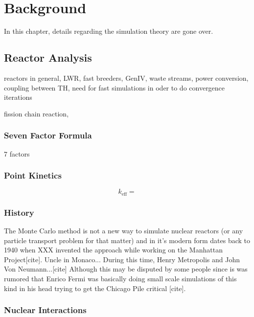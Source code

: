 \chapter{Background}

In this chapter, details regarding the simulation theory are gone over.  

\section{Reactor Analysis}

reactors in general, LWR, fast breeders, GenIV, waste streams, power conversion, coupling between TH, need for fast simulations in oder to do convergence iterations

fission chain reaction, 

\subsection{Seven Factor Formula}
 7 factors

\subsection{Point Kinetics}

\begin{equation}
\label{keff}
k_\mathrm{eff} = 
\end{equation}







\subsection{History}

The Monte Carlo method is not a new way to simulate nuclear reactors (or any particle transport problem for that matter) and in it's modern form dates back to 1940 when XXX invented the approach while working on the Manhattan Project[cite]. Uncle in Monaco...  During this time, Henry Metropolis and John Von Neumann...[cite]  Although this may be disputed by some people since is was rumored that Enrico Fermi was basically doing small scale simulations of this kind in his head trying to get the Chicago Pile critical [cite].



\subsection{Nuclear Interactions}
\label{subsec:interactions}

